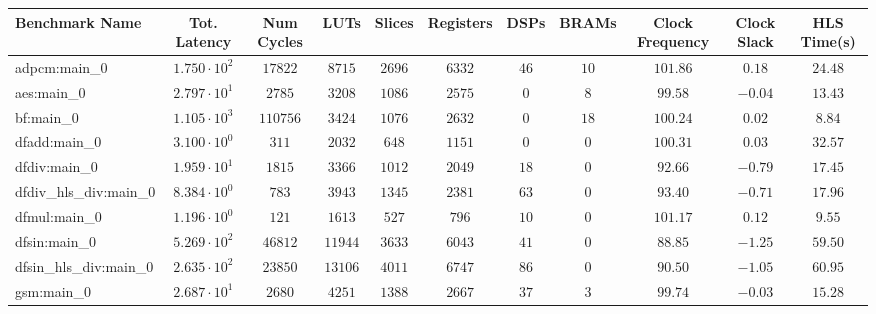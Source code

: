 \begin{tabular}{|l|c|c|c|c|c|c|c|c|c|c|}
\hline
Benchmark Name          & Tot. Latency           & Num Cycles & LUTs      & Slices    & Registers & DSPs    & BRAMs   & Clock Frequency & Clock Slack & HLS Time(s) \\
\hline
adpcm:main\_0           & $ 1.750 \cdot 10^{2} $ & $ 17822  $ & $ 8715  $ & $ 2696  $ & $ 6332  $ & $ 46  $ & $ 10  $ & $ 101.86      $ & $ 0.18    $ & $ 24.48   $ \\
aes:main\_0             & $ 2.797 \cdot 10^{1} $ & $ 2785   $ & $ 3208  $ & $ 1086  $ & $ 2575  $ & $ 0   $ & $ 8   $ & $ 99.58       $ & $ -0.04   $ & $ 13.43   $ \\
bf:main\_0              & $ 1.105 \cdot 10^{3} $ & $ 110756 $ & $ 3424  $ & $ 1076  $ & $ 2632  $ & $ 0   $ & $ 18  $ & $ 100.24      $ & $ 0.02    $ & $ 8.84    $ \\
dfadd:main\_0           & $ 3.100 \cdot 10^{0} $ & $ 311    $ & $ 2032  $ & $ 648   $ & $ 1151  $ & $ 0   $ & $ 0   $ & $ 100.31      $ & $ 0.03    $ & $ 32.57   $ \\
dfdiv:main\_0           & $ 1.959 \cdot 10^{1} $ & $ 1815   $ & $ 3366  $ & $ 1012  $ & $ 2049  $ & $ 18  $ & $ 0   $ & $ 92.66       $ & $ -0.79   $ & $ 17.45   $ \\
dfdiv\_hls\_div:main\_0 & $ 8.384 \cdot 10^{0} $ & $ 783    $ & $ 3943  $ & $ 1345  $ & $ 2381  $ & $ 63  $ & $ 0   $ & $ 93.40       $ & $ -0.71   $ & $ 17.96   $ \\
dfmul:main\_0           & $ 1.196 \cdot 10^{0} $ & $ 121    $ & $ 1613  $ & $ 527   $ & $ 796   $ & $ 10  $ & $ 0   $ & $ 101.17      $ & $ 0.12    $ & $ 9.55    $ \\
dfsin:main\_0           & $ 5.269 \cdot 10^{2} $ & $ 46812  $ & $ 11944 $ & $ 3633  $ & $ 6043  $ & $ 41  $ & $ 0   $ & $ 88.85       $ & $ -1.25   $ & $ 59.50   $ \\
dfsin\_hls\_div:main\_0 & $ 2.635 \cdot 10^{2} $ & $ 23850  $ & $ 13106 $ & $ 4011  $ & $ 6747  $ & $ 86  $ & $ 0   $ & $ 90.50       $ & $ -1.05   $ & $ 60.95   $ \\
gsm:main\_0             & $ 2.687 \cdot 10^{1} $ & $ 2680   $ & $ 4251  $ & $ 1388  $ & $ 2667  $ & $ 37  $ & $ 3   $ & $ 99.74       $ & $ -0.03   $ & $ 15.28   $ \\

\end{tabular}
